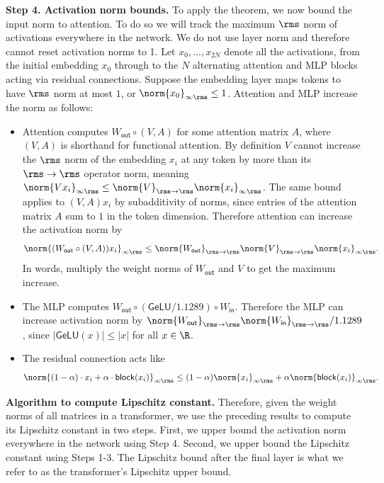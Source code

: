 \textbf{Step 4. Activation norm bounds.} To apply the theorem, we now bound the input norm to attention. To do so we will track the maximum $\rms$ norm of activations everywhere in the network. We do not use layer norm and therefore cannot reset activation norms to 1. Let $x_0, \dots, x_{2N}$ denote all the activations, from the initial embedding $x_0$ through to the $N$ alternating attention and MLP blocks acting via residual connections. Suppose the embedding layer maps tokens to have $\rms$ norm at most $1$, or $\norm{x_0}_{\infty\rms} \leq 1$. Attention and MLP increase the norm as follows:
\begin{itemize}
    \item Attention computes $W_\mathsf{out} \circ (V, A)$ for some attention matrix $A$, where $(V, A)$ is shorthand for functional attention. By definition $V$ cannot increase the $\rms$ norm of the embedding $x_i$ at any token by more than its $\rms\to\rms$ operator norm, meaning $\norm{V x_i}_{\infty\rms} \leq \norm{V}_{\rms\to\rms} \norm{x_i}_{\infty\rms}$. The same bound applies to $(V, A)x_i$ by subadditivity of norms, since entries of the attention matrix $A$ sum to $1$ in the token dimension. Therefore attention can increase the activation norm by \begin{equation}
        \norm{(W_\mathsf{out} \circ (V, A))x_i}_{\infty\rms} \leq \norm{W_\mathsf{out}}_{\rms\to\rms} \norm{V}_{\rms\to\rms} \norm{x_i}_{\infty\rms}.
    \end{equation} In words, multiply the weight norms of $W_\mathsf{out}$ and $V$ to get the maximum increase.
    \item The MLP computes $W_\mathsf{out} \circ (\mathsf{GeLU} / 1.1289) \circ W_\mathsf{in}$. Therefore the MLP can increase activation norm by $\norm{W_\mathsf{out}}_{\rms\to\rms} \norm{W_\mathsf{in}}_{\rms\to\rms} / 1.1289$, since $|\mathsf{GeLU}(x)| \leq |x|$ for all $x \in \R$.
    \item The residual connection acts like \begin{equation}
        \norm{(1 - \alpha) \cdot x_i + \alpha \cdot \mathsf{block}(x_i)}_{\infty\rms} \leq (1 - \alpha) \norm{x_i}_{\infty \rms} + \alpha \norm{\mathsf{block}(x_i)}_{\infty\rms}.
    \end{equation}
\end{itemize}

\textbf{Algorithm to compute Lipschitz constant.} Therefore, given the weight norms of all matrices in a transformer, we use the preceding results to compute its Lipschitz constant in two steps. First, we upper bound the activation norm everywhere in the network using Step 4. Second, we upper bound the Lipschitz constant using Steps 1-3. The Lipschitz bound after the final layer is what we refer to as the transformer's Lipschitz upper bound.


